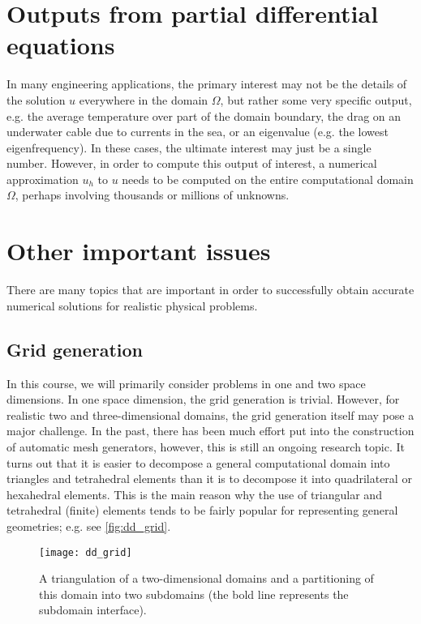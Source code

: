 \section{Outputs from partial differential equations}

In many engineering applications, the primary interest may not be the details of
the solution $u$ everywhere in the domain $\Omega$, but rather some very
specific output, e.g. the average temperature over part of the domain boundary,
the drag on an underwater cable due to currents in the sea, or an eigenvalue
(e.g. the lowest eigenfrequency). In these cases, the ultimate interest may
just be a single number. However, in order to compute this output of interest, a
numerical approximation $u_h$ to $u$ needs to be computed on the entire
computational domain $\Omega$, perhaps involving thousands or millions of
unknowns.

\section{Other important issues}

There are many topics that are important in order to successfully obtain
accurate numerical solutions for realistic physical problems.

\subsection{Grid generation}

In this course, we will primarily consider problems in one and two space
dimensions. In one space dimension, the grid generation is trivial. However, for
realistic two and three-dimensional domains, the grid generation itself may pose
a major challenge. In the past, there has been much effort put into the
construction of automatic mesh generators, however, this is still an ongoing
research topic. It turns out that it is easier to decompose a general
computational domain into triangles and tetrahedral elements than it is to
decompose it into quadrilateral or hexahedral elements. This is the main reason
why the use of triangular and tetrahedral (finite) elements tends to be fairly
popular for representing general geometries; e.g. see \autoref{fig:dd_grid}.

\begin{figure}[htbp]
  \begin{center}
    \texttt{[image: dd\_grid]}
  \end{center}
  \caption{
    A triangulation of a two-dimensional domains and a partitioning of this
    domain into two subdomains (the bold line represents the subdomain
    interface).
  }
  \label{fig:dd_grid}
\end{figure}

